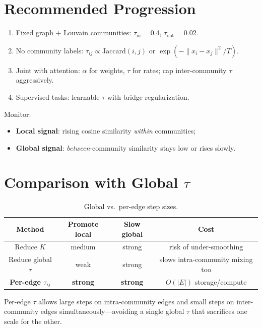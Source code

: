 \documentclass[11pt,a4paper]{report}
\begin{document}
\section{Recommended Progression}

\begin{enumerate}
    \item Fixed graph + Louvain communities: $\tau_{\mathrm{in}}=0.4$, $\tau_{\mathrm{out}}=0.02$.
    \item No community labels: $\tau_{ij} \propto \mathrm{Jaccard}(i,j)$ or $\exp(-\|x_i-x_j\|^2/T)$.
    \item Joint with attention: $\alpha$ for weights, $\tau$ for rates; cap inter-community $\tau$ aggressively.
    \item Supervised tasks: learnable $\tau$ with bridge regularization.
\end{enumerate}

Monitor:
\begin{itemize}[noitemsep]
    \item \textbf{Local signal}: rising cosine similarity \emph{within} communities;
    \item \textbf{Global signal}: \emph{between}-community similarity stays low or rises slowly.
\end{itemize}

\section{Comparison with Global \texorpdfstring{$\tau$}{tau}}

\begin{table}[h]
\centering
\caption{Global vs.\ per-edge step sizes.}
\begin{tabular}{@{}cccc@{}}
\toprule
\textbf{Method} & \textbf{Promote local} & \textbf{Slow global} & \textbf{Cost} \\
\midrule
Reduce $K$           & medium & strong & risk of under-smoothing \\
Reduce global $\tau$ & weak   & strong & slows intra-community mixing too \\
\textbf{Per-edge $\tau_{ij}$} & \textbf{strong} & \textbf{strong} & $O(|E|)$ storage/compute \\
\bottomrule
\end{tabular}
\end{table}

Per-edge $\tau$ allows large steps on intra-community edges and small steps on inter-community edges simultaneously---avoiding a single global $\tau$ that sacrifices one scale for the other.
\end{document}
